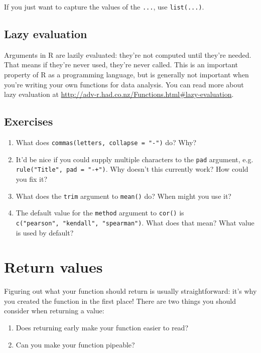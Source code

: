 \documentclass[]{book}
\begin{document}
If you just want to capture the values of the \texttt{...}, use
\texttt{list(...)}.

\subsection{Lazy evaluation}\label{lazy-evaluation}

Arguments in R are lazily evaluated: they're not computed until they're
needed. That means if they're never used, they're never called. This is
an important property of R as a programming language, but is generally
not important when you're writing your own functions for data analysis.
You can read more about lazy evaluation at
\url{http://adv-r.had.co.nz/Functions.html\#lazy-evaluation}.

\subsection{Exercises}\label{exercises-50}

\begin{enumerate}
\def\labelenumi{\arabic{enumi}.}
\item
  What does \texttt{commas(letters,\ collapse\ =\ "-")} do? Why?
\item
  It'd be nice if you could supply multiple characters to the
  \texttt{pad} argument, e.g. \texttt{rule("Title",\ pad\ =\ "-+")}. Why
  doesn't this currently work? How could you fix it?
\item
  What does the \texttt{trim} argument to \texttt{mean()} do? When might
  you use it?
\item
  The default value for the \texttt{method} argument to \texttt{cor()}
  is \texttt{c("pearson",\ "kendall",\ "spearman")}. What does that
  mean? What value is used by default?
\end{enumerate}

\section{Return values}\label{return-values}

Figuring out what your function should return is usually
straightforward: it's why you created the function in the first place!
There are two things you should consider when returning a value:

\begin{enumerate}
\def\labelenumi{\arabic{enumi}.}
\item
  Does returning early make your function easier to read?
\item
  Can you make your function pipeable?
\end{enumerate}
\end{document}
